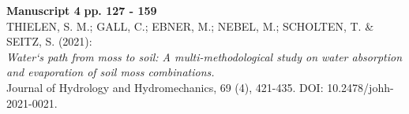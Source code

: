 \noindent
\textbf{Manuscript 4} \hfill \textbf{pp. 127 - 159} \\ %
THIELEN, S. M.; GALL, C.; EBNER, M.; NEBEL, M.; SCHOLTEN, T. \& SEITZ, S. (2021): \\
\textit{Water`s path from moss to soil: A multi-methodological study on water absorption and evaporation of soil moss combinations.} \\
Journal of Hydrology and Hydromechanics, 69 (4), 421-435. DOI: 10.2478/johh-2021-0021.







% 
